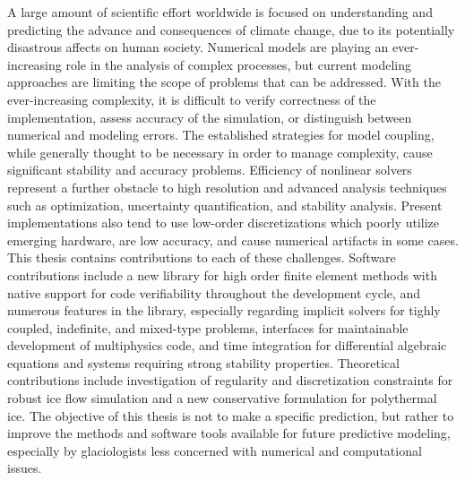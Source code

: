 A large amount of scientific effort worldwide is focused on understanding and predicting the advance and consequences of climate change, due to its potentially disastrous affects on human society.
Numerical models are playing an ever-increasing role in the analysis of complex processes, but current modeling approaches are limiting the scope of problems that can be addressed.
With the ever-increasing complexity, it is difficult to verify correctness of the implementation, assess accuracy of the simulation, or distinguish between numerical and modeling errors.
The established strategies for model coupling, while generally thought to be necessary in order to manage complexity, cause significant stability and accuracy problems.
Efficiency of nonlinear solvers represent a further obstacle to high resolution and advanced analysis techniques such as optimization, uncertainty quantification, and stability analysis.
Present implementations also tend to use low-order discretizations which poorly utilize emerging hardware, are low accuracy, and cause numerical artifacts in some cases.
This thesis contains contributions to each of these challenges.
Software contributions include a new library for high order finite element methods with native support for code verifiability throughout the development cycle, and numerous features in the {\PETSc} library, especially regarding implicit solvers for tighly coupled, indefinite, and mixed-type problems, interfaces for maintainable development of multiphysics code, and time integration for differential algebraic equations and systems requiring strong stability properties.
Theoretical contributions include investigation of regularity and discretization constraints for robust ice flow simulation and a new conservative formulation for polythermal ice.
The objective of this thesis is not to make a specific prediction, but rather to improve the methods and software tools available for future predictive modeling, especially by glaciologists less concerned with numerical and computational issues.
